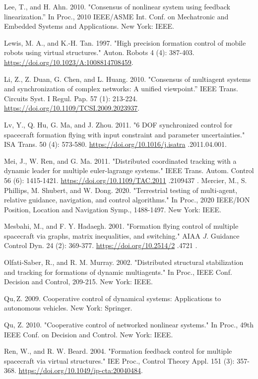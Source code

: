 \documentclass[10pt]{article}
\begin{document}
Lee, T., and H. Ahn. 2010. "Consensus of nonlinear system using feedback linearization.” In Proc., 2010 IEEE/ASME Int. Conf. on Mechatronic and Embedded Systems and Applications. New York: IEEE.

Lewis, M. A., and K.-H. Tan. 1997. "High precision formation control of mobile robots using virtual structures." Auton. Robots 4 (4): 387-403. \href{https://doi.org/10.1023/A:1008814708459}{https://doi.org/10.1023/A:1008814708459}.

Li, Z., Z. Duan, G. Chen, and L. Huang. 2010. "Consensus of multiagent systems and synchronization of complex networks: A unified viewpoint.” IEEE Trans. Circuits Syst. I Regul. Pap. 57 (1): 213-224. \href{https://doi.org/10.1109/TCSI.2009.2023937}{https://doi.org/10.1109/TCSI.2009.2023937}.

Lv, Y., Q. Hu, G. Ma, and J. Zhou. 2011. "6 DOF synchronized control for spacecraft formation flying with input constraint and parameter uncertainties." ISA Trans. 50 (4): 573-580. \href{https://doi.org/10.1016/j.isatra}{https://doi.org/10.1016/j.isatra} .2011.04.001.

Mei, J., W. Ren, and G. Ma. 2011. "Distributed coordinated tracking with a dynamic leader for multiple euler-lagrange systems." IEEE Trans. Autom. Control 56 (6): 1415-1421. \href{https://doi.org/10.1109/TAC.2011}{https://doi.org/10.1109/TAC.2011} .2109437 . Mercier, M., S. Phillips, M. Shubert, and W. Dong. 2020. "Terrestrial testing of multi-agent, relative guidance, navigation, and control algorithms." In Proc., 2020 IEEE/ION Position, Location and Navigation Symp., 1488-1497. New York: IEEE.

Mesbahi, M., and F. Y. Hadaegh. 2001. "Formation flying control of multiple spacecraft via graphs, matrix inequalities, and switching." AIAA $J$. Guidance Control Dyn. 24 (2): 369-377. \href{https://doi.org/10.2514/2}{https://doi.org/10.2514/2} .4721 .

Olfati-Saber, R., and R. M. Murray. 2002. "Distributed structural stabilization and tracking for formations of dynamic multiagents." In Proc., IEEE Conf. Decision and Control, 209-215. New York: IEEE.

$\mathrm{Qu}, \mathrm{Z}$. 2009. Cooperative control of dynamical systems: Applications to autonomous vehicles. New York: Springer.

Qu, Z. 2010. "Cooperative control of networked nonlinear systems." In Proc., 49th IEEE Conf. on Decision and Control. New York: IEEE.

Ren, W., and R. W. Beard. 2004. "Formation feedback control for multiple spacecraft via virtual structures." IEE Proc., Control Theory Appl. 151 (3): 357-368. \href{https://doi.org/10.1049/ip-cta:20040484}{https://doi.org/10.1049/ip-cta:20040484}.
\end{document}

